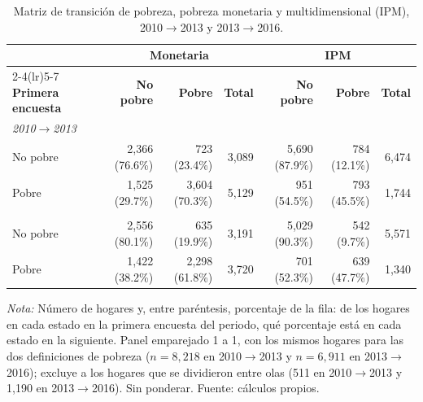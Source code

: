 \begin{table}[tbp]
  \centering
  \caption{Matriz de transición de pobreza, pobreza monetaria y
  multidimensional (IPM), 2010$\to$2013 y 2013$\to$2016.}
  \label{tab:matriz_transicion}
  \footnotesize
  \setlength{\tabcolsep}{4pt}
  \begin{tabular}{l rrr rrr}
    \toprule
    & \multicolumn{3}{c}{\textbf{Monetaria}} & \multicolumn{3}{c}{\textbf{IPM}} \\
    \cmidrule(lr){2-4}\cmidrule(lr){5-7}
    \textbf{Primera encuesta} & \textbf{No pobre} & \textbf{Pobre} & \textbf{Total} & \textbf{No pobre} & \textbf{Pobre} & \textbf{Total} \\
    \midrule
    \multicolumn{7}{l}{\textit{2010$\to$2013}} \\
    \quad No pobre & 2{,}366 (76.6\%) & 723 (23.4\%) & 3{,}089 & 5{,}690 (87.9\%) & 784 (12.1\%) & 6{,}474 \\
    \quad Pobre & 1{,}525 (29.7\%) & 3{,}604 (70.3\%) & 5{,}129 & 951 (54.5\%) & 793 (45.5\%) & 1{,}744 \\
    \addlinespace
    \multicolumn{7}{l}{\textit{2013$\to$2016}} \\
    \quad No pobre & 2{,}556 (80.1\%) & 635 (19.9\%) & 3{,}191 & 5{,}029 (90.3\%) & 542 (9.7\%) & 5{,}571 \\
    \quad Pobre & 1{,}422 (38.2\%) & 2{,}298 (61.8\%) & 3{,}720 & 701 (52.3\%) & 639 (47.7\%) & 1{,}340 \\
    \bottomrule
  \end{tabular}
  \begin{minipage}{0.95\textwidth}
    \vspace{4pt}
    \footnotesize \textit{Nota:} Número de hogares y, entre paréntesis,
    porcentaje de la fila: de los hogares en cada estado en la primera
    encuesta del periodo, qué porcentaje está en cada estado en la
    siguiente. Panel emparejado 1 a 1, con los mismos hogares para las dos
    definiciones de pobreza ($n=8{,}218$ en 2010$\to$2013 y $n=6{,}911$
    en 2013$\to$2016); excluye a los hogares que se dividieron entre olas
    (511 en 2010$\to$2013 y 1{,}190 en 2013$\to$2016). Sin ponderar.
    Fuente: cálculos propios.
  \end{minipage}
\end{table}